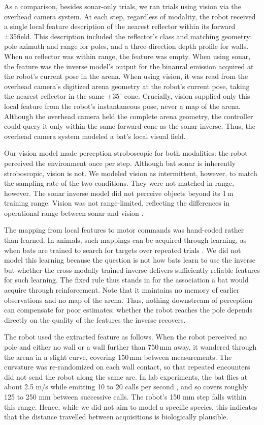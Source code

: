 \documentclass[11pt]{article}
\begin{document}
As a comparison, besides sonar-only trials, we ran trials using vision via the overhead camera system. At each step, regardless of modality, the robot received a single local feature description of the nearest reflector within its forward ±35\textdegree field. This description included the reflector's class and matching geometry: pole azimuth and range for poles, and a three-direction depth profile for walls. When no reflector was within range, the feature was empty. When using sonar, the feature was the inverse model's output for the binaural emission acquired at the robot's current pose in the arena. When using vision, it was read from the overhead camera's digitized arena geometry at the robot's current pose, taking the nearest reflector in the same $\pm 35^{\circ}$ cone. Crucially, vision supplied only this local feature from the robot's instantaneous pose, never a map of the arena. Although the overhead camera held the complete arena geometry, the controller could query it only within the same forward cone as the sonar inverse. Thus, the overhead camera system modeled a bat's local visual field.

Our vision model made perception stroboscopic for both modalities: the robot perceived the environment once per step. Although bat sonar is inherently stroboscopic, vision is not. We modeled vision as intermittent, however, to match the sampling rate of the two conditions. They were not matched in range, however. The sonar inverse model did not perceive objects beyond its 1\,m training range. Vision was not range-limited, reflecting the differences in operational range between sonar and vision \citep{Boonman2013}.


The mapping from local features to motor commands was hand-coded rather than learned. In animals, such mappings can be acquired through learning, as when bats are trained to search for targets over repeated trials \citep{Ghose2003,Falk2014,Simon2011,Holland2005,Finger2025}. We did not model this learning because the question is not how bats learn to use the inverse but whether the cross-modally trained inverse delivers sufficiently reliable features for such learning. The fixed rule thus stands in for the association a bat would acquire through reinforcement. Note that it maintains no memory of earlier observations and no map of the arena. Thus, nothing downstream of perception can compensate for poor estimates; whether the robot reaches the pole depends directly on the quality of the features the inverse recovers.

The robot used the extracted feature as follows. When the robot perceived no pole and either no wall or a wall further than 750\,mm away, it wandered through the arena in a slight curve, covering 150\,mm between measurements. The curvature was re-randomized on each wall contact, so that repeated encounters did not send the robot along the same arc. In lab experiments, the bat  flies at about 2.5 m/s while emitting 10 to 20 calls per second \citep[e.g.,][]{Barchi2013}, and so covers roughly 125 to 250 mm between successive calls. The robot's 150 mm step falls within this range. Hence, while we did not aim to model a specific species, this indicates that the distance travelled between acquisitions is biologically plausible.
\end{document}
